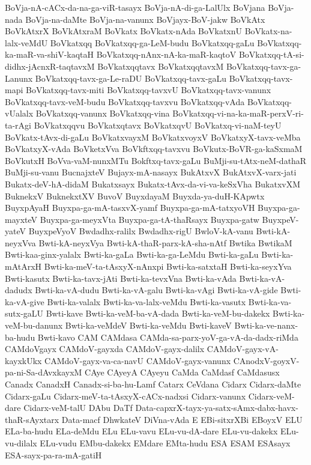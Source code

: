{BoVja-nA-cACx-da-na-ga-viR-tasayx
BoVja-nA-di-ga-LalUlx
BoVjana
BoVja-nada
BoVja-na-daMte
BoVja-na-vanunx
BoVjayx-BoV-jakw
BoVkAtx
BoVkAtxrX
BoVkAtxraM
BoVkatx
BoVkatx-nAda
BoVkatxnU
BoVkatx-na-lalx-veMdU
BoVkatxqq
BoVkatxqq-ga-LeM-budu
BoVkatxqq-gaLu
BoVkatxqq-ka-maR-va-shiV-kaqtaH
BoVkatxqq-nAnx-nA-ka-maR-kaqtoV
BoVkatxqq-tA-si-didhx-jAcnxR-taqtavxM
BoVkatxqqtavx
BoVkatxqqtavxM
BoVkatxqq-tavx-ga-Lanunx
BoVkatxqq-tavx-ga-Le-raDU
BoVkatxqq-tavx-gaLu
BoVkatxqq-tavx-mapi
BoVkatxqq-tavx-miti
BoVkatxqq-tavxvU
BoVkatxqq-tavx-vanunx
BoVkatxqq-tavx-veM-budu
BoVkatxqq-tavxvu
BoVkatxqq-vAda
BoVkatxqq-vUalalx
BoVkatxqq-vanunx
BoVkatxqq-vina
BoVkatxqq-vi-na-ka-maR-perxV-ri-ta-rAgi
BoVkatxqqvu
BoVkatxqtavx
BoVkatxqvU
BoVkatxq-vi-naM-teyU
BoVkatx-tAvx-di-gaLu
BoVkatxvayxM
BoVkatxvoyxV
BoVkatxyX-tavx-veMba
BoVkatxyX-vAda
BoVketxVva
BoVkftxqq-tavxvu
BoVkutx-BoVR-ga-kaSxmaM
BoVkutxH
BoVva-vaM-nunxMTu
Bokftxq-tavx-gaLu
BuMji-su-tAtx-neM-dathaR
BuMji-su-vanu
BucnajxteV
Bujayx-mA-nasayx
BukAtxvX
BukAtxvX-varx-jati
Bukatx-deV-hA-didaM
Bukatxsayx
Bukatx-tAvx-da-vi-va-keSxVha
BukatxvXM
BuknekxV
BuknekxtXV
BuvoV
BuyxdayaM
Buyxda-ya-duH-KApwtx
BuyxpAyaH
Buyxpa-ga-mA-tasxvX-yamf
Buyxpa-ga-mA-tatxyoVH
Buyxpa-ga-mayxteV
Buyxpa-ga-meyxVta
Buyxpa-ga-tA-thaRsayx
Buyxpa-gatw
BuyxpeV-yateV
BuyxpeVyoV
Bwdadhx-ralilx
Bwdadhx-rigU
BwloV-kA-vanu
Bwti-kA-neyxVva
Bwti-kA-neyxVya
Bwti-kA-thaR-parx-kA-sha-nAtf
Bwtika
BwtikaM
Bwti-kaa-ginx-yalalx
Bwti-ka-gaLa
Bwti-ka-ga-LeMdu
Bwti-ka-gaLu
Bwti-ka-mAtArxH
Bwti-ka-meV-ta-tAsxyX-nAnxpi
Bwti-ka-satxtaH
Bwti-ka-seyxYva
Bwti-kasutx
Bwti-ka-tavx-jAti
Bwti-ka-tevxVna
Bwti-ka-vAda
Bwti-ka-vA-dadudx
Bwti-ka-vA-dudu
Bwti-ka-vA-galu
Bwti-ka-vAgi
Bwti-ka-vA-gide
Bwti-ka-vA-give
Bwti-ka-valalx
Bwti-ka-va-lalx-veMdu
Bwti-ka-vasutx
Bwti-ka-va-sutx-gaLU
Bwti-kave
Bwti-ka-veM-ba-vA-dada
Bwti-ka-veM-bu-dakekx
Bwti-ka-veM-bu-danunx
Bwti-ka-veMdeV
Bwti-ka-veMdu
Bwti-kaveV
Bwti-ka-ve-nanx-ba-hudu
Bwti-kavo
CAM
CAMdasa
CAMda-sa-parx-yoV-ga-vA-da-dadx-riMda
CAMdoVgayx
CAMdoV-gayxda
CAMdoV-gayx-dalilx
CAMdoV-gayx-vA-kayxkUkx
CAMdoV-gayx-va-ca-navU
CAMdoV-gayx-vanunx
CAnodxV-goyxV-pa-ni-Sa-dAvxkayxM
CAye
CAyeyA
CAyeyu
CaMda
CaMdasf
CaMdasusx
Canadx
CanadxH
Canadx-si-ba-hu-Lamf
Catarx
CeVdana
Cidarx
Cidarx-daMte
Cidarx-gaLu
Cidarx-meV-ta-tAsxyX-cACx-nadxsi
Cidarx-vanunx
Cidarx-veM-dare
Cidarx-veM-talU
DAbu
DaTf
Data-capxrX-tayx-ya-satx-sAmx-dabx-havx-thaR-sAyxtarx
Data-macf
DhwkateV
DiVna-vAda
E
EBi-sitxrXBi
EBoyxV
ELU
ELa-ba-hudu
ELa-deMdu
ELu
ELu-vavu
ELu-vu-dA-dare
ELu-vu-dakekx
ELu-vu-dilalx
ELu-vudu
EMbu-dakekx
EMdare
EMta-hudu
ESA
ESAM
ESAsayx
ESA-sayx-pa-ra-mA-gatiH
}
